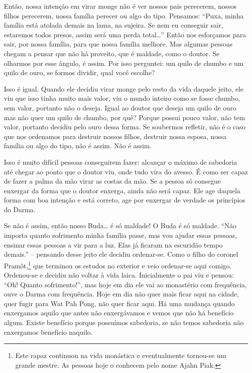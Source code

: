 Então, nossa intenção em virar monge não é ver nossos pais
perecerem, nossos filhos perecerem, nossa família perecer ou algo do
tipo. Pensamos: “Puxa, minha família está atolada demais na lama, na
sujeira. Se nem eu conseguir sair, estaremos todos presos, assim será
uma perda total…” Então nos esforçamos para sair, por nossa família,
para que nossa família melhore. Mas algumas pessoas chegam a pensar que
não há proveito, que é maldade, como o doutor. Se olharmos por esse
ângulo, é assim. Por isso perguntei: um quilo de chumbo e um quilo de
ouro, se formos dividir, qual você escolhe? 

Isso é igual. Quando ele decidiu virar monge pelo resto da vida
daquele jeito, ele viu que isso tinha muito mais valor, viu o mundo
inteiro como se fosse chumbo, sem valor, portanto não o deseja. Igual
ao doutor que deseja um quilo de ouro mas não quer um quilo de chumbo,
por quê? Porque possui pouco valor, não tem valor, portanto decidiu
pelo ouro dessa forma. Se soubermos refletir, não é o caso que nos
ordenamos para destruir nossos filhos, destruir nossa esposa, nossa
família ou algo do tipo, não é assim. Não é assim.

Isso é muito difícil pessoas conseguirem fazer: alcançar o máximo de
sabedoria até chegar ao ponto que o doutor viu, onde tudo vira do
avesso. É como ser capaz de fazer a palma da mão virar as costas da
mão. Se a pessoa só consegue enxergar da forma que o doutor enxerga,
ainda não será capaz. Ele age daquela forma com boa intenção e está
correto, age por enxergar de verdade os princípios do Darma. 

Se não é assim, então nosso Buda… é só maldade! O Buda é só maldade.
“Não importa quanto sofrimento minha família passe, mas vou ajudar
essas pessoas, ensinar essas pessoas a vir para a luz. Elas já ficaram
na escuridão tempo demais.” – pensando desse jeito ele decidiu
ordenar-se. Como o filho do coronel Pramôt,\footnote{Este rapaz
continuou na vida monástica e eventualmente tornou-se um grande mestre.
As pessoas hoje o conhecem pelo nome Ajahn Piak.} que terminou os
estudos no exterior e veio ordenar-se aqui comigo. Ordenou-se e decidiu
não voltar à vida laica. Inicialmente o pai viu e pensou: “Oh! Quanto
sofrimento!”, mas hoje em dia ele vai ao monastério com frequência,
ouve o Darma com frequência. Hoje em dia não quer mais ficar aqui na
cidade, quer fugir para Wat Pah Pong, não quer ficar aqui. Há uma
mudança quando enxergamos aquilo que antes não enxergávamos e vemos que
não há benefício algum. Existe benefício porque possuímos sabedoria, se
não temos sabedoria não enxergamos benefício naquilo. 

